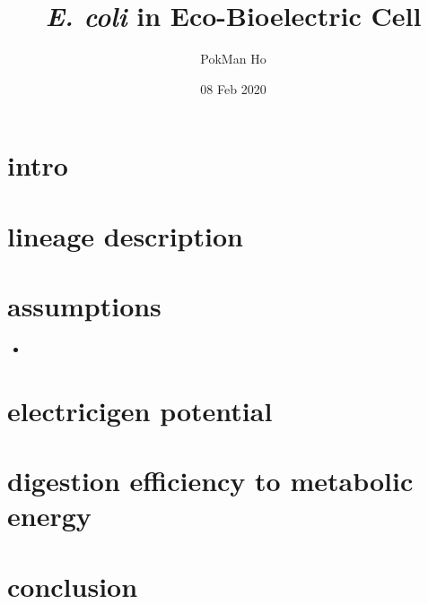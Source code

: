 \documentclass[a4paper,11pt]{article}
\title{\textit{E. coli} in Eco-Bioelectric Cell}
\author{PokMan Ho}
\date{08 Feb 2020}
\begin{document}
    \maketitle
    \tableofcontents
    \maketitle
    \tableofcontents
    \clearpage
    
    \section{intro}
    
    \section{lineage description}
    
    \section{assumptions}
    \begin{itemize}
        \item 
    \end{itemize}
    
    \section{electricigen potential}
    
    \section{digestion efficiency to metabolic energy}
    
    \section{conclusion}
    
    \nocite{*}\printbibliography
\end{document}
